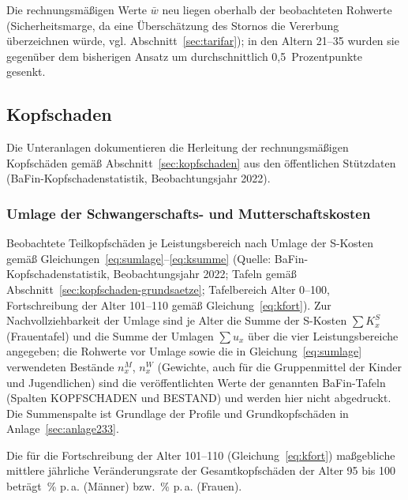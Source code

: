 Die rechnungsmäßigen Werte $\bar{w}$ neu liegen oberhalb der
beobachteten Rohwerte (Sicherheitsmarge, da eine Überschätzung des
Stornos die Vererbung überzeichnen würde, vgl.
Abschnitt~\ref{sec:tarifar}); in den Altern 21--35 wurden sie
gegenüber dem bisherigen Ansatz um durchschnittlich
0{,}5~Prozentpunkte gesenkt.


\clearpage


\subsection{Kopfschaden}\label{sec:anlagenteil23}

Die Unteranlagen dokumentieren die Herleitung der rechnungsmäßigen
Kopfschäden gemäß Abschnitt~\ref{sec:kopfschaden} aus den öffentlichen
Stützdaten (BaFin-Kopfschadenstatistik, Beobachtungsjahr 2022).

\setcounter{subsubsection}{1}
\subsubsection{Umlage der Schwangerschafts- und Mutterschaftskosten}\label{sec:anlage232}

Beobachtete Teilkopfschäden je Leistungsbereich nach Umlage der
S-Kosten gemäß Gleichungen~\eqref{eq:sumlage}--\eqref{eq:ksumme}
(Quelle: BaFin-Kopfschadenstatistik, Beobachtungsjahr 2022; Tafeln
gemäß Abschnitt~\ref{sec:kopfschaden-grundsaetze}; Tafelbereich
Alter 0--100, Fortschreibung der Alter 101--110 gemäß
Gleichung~\eqref{eq:kfort}). Zur Nachvollziehbarkeit der Umlage sind
je Alter die Summe der S-Kosten $\sum K^{S}_x$ (Frauentafel) und die
Summe der Umlagen $\sum u_x$ über die vier Leistungsbereiche
angegeben; die Rohwerte vor Umlage sowie die in
Gleichung~\eqref{eq:sumlage} verwendeten Bestände $n^{M}_x$, $n^{W}_x$
(Gewichte, auch für die Gruppenmittel der Kinder und Jugendlichen)
sind die veröffentlichten Werte der genannten BaFin-Tafeln (Spalten
KOPFSCHADEN und BESTAND) und werden hier nicht abgedruckt. Die
Summenspalte ist Grundlage der Profile und Grundkopfschäden in
Anlage~\ref{sec:anlage233}.

Die für die Fortschreibung der Alter 101--110
(Gleichung~\eqref{eq:kfort}) maßgebliche mittlere jährliche
Veränderungsrate der Gesamtkopfschäden der Alter 95 bis 100 beträgt
\WachstumM\,\% p.\,a. (Männer) bzw. \WachstumF\,\% p.\,a. (Frauen).

